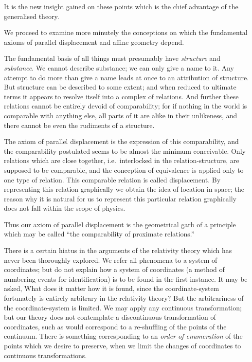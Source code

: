 \documentclass[12pt]{book}
\begin{document}
It is the new insight gained on these points which is the chief advantage
of the generalised theory.

%
%

We proceed to examine more minutely the conceptions on which the
fundamental axioms of parallel displacement and affine geometry depend.

The fundamental basis of all things must presumably have \emph{structure} and
\emph{substance}. We cannot describe substance; we can only give a name to it.
Any attempt to do more than give a name leads at once to an attribution of
structure. But structure can be described to some extent; and when reduced
to ultimate terms it appears to resolve itself into a complex of relations. And
further these relations cannot be entirely devoid of comparability; for if
nothing in the world is comparable with anything else, all parts of it are alike
in their unlikeness, and there cannot be even the rudiments of a structure.

The axiom of parallel displacement is the expression of this comparability,
and the comparability postulated seems to be almost the minimum conceivable.
Only relations which are close together, i.e.\ interlocked in the relation\hyp{}structure,
are supposed to be comparable, and the conception of equivalence
is applied only to one type of relation. This comparable relation is called
displacement. By representing this relation graphically we obtain the idea of
location in space; the reason why it is natural for us to represent this particular
relation graphically does not fall within the scope of physics.

Thus our axiom of parallel displacement is the geometrical garb of a
principle which may be called ``the comparability of proximate relations.''
%

There is a certain hiatus in the arguments of the relativity theory which
has never been thoroughly explored. We refer all phenomena to a system of
coordinates; but do not explain how a system of coordinates (a method of
%
numbering events for identification) is to be found in the first instance. It
may be asked, What does it matter how it is found, since the coordinate\hyp{}system
fortunately is entirely arbitrary in the relativity theory? But the
arbitrariness of the coordinate\hyp{}system is limited. We may apply any continuous
transformation; but our theory does not contemplate a discontinuous
transformation of coordinates, such as would correspond to a re\hyp{}shuffling of
%
the points of the continuum. There is something corresponding to an \emph{order of
enumeration} of the points which we desire to preserve, when we limit the
changes of coordinates to continuous transformations.
\end{document}

